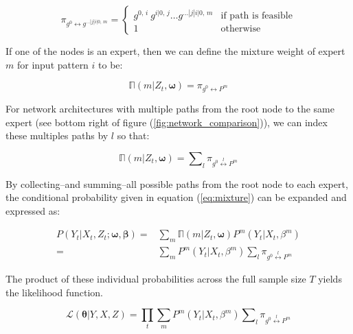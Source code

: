 \documentclass[12pt]{article}
\newcommand{\gateprod}[2]{\pi_{#1 \longleftrightarrow #2}}
\newcommand{\sumgateprod}[3]{\pi_{#1 \overset{#3}{\longleftrightarrow} #2}}
\newcommand{\shortsum}[1]{\sum \nolimits_{#1}}
\newcommand{\expmixwt}[0]{\mathbb{\Pi}}
\begin{document}
\begin{equation} \label{eq:gpath}
  \gateprod{g^{0}}{g^{\ldots|j|i|0, \, m}} =
    \begin{cases} 
       g^{0, \, i} \ g^{i|0, \, j} \ldots g^{\dots|j|i|0, \, m} & \textrm{if path is feasible} \\
       1 & \textrm{otherwise}
    \end{cases}
\end{equation}

If one of the nodes is an expert, then we can define the mixture weight
of expert $m$ for input pattern $i$ to be:

\begin{equation} \label{eq:pathsum}
  \expmixwt(m | Z_{t}, \boldsymbol{\omega}) = \gateprod{g^{0}}{P^{m}}
\end{equation}

For network architectures with multiple paths from the root node to
the same expert (see bottom right of figure (\ref{fig:network_comparison})),
we can index these multiples paths by $l$ so that:

\begin{equation} \label{eq:pathsums}
  \expmixwt(m | Z_{t}, \boldsymbol{\omega}) = \shortsum{l} \sumgateprod{g^{0}}{P^{m}}{l} 
\end{equation}


By collecting--and summing--all possible paths from the root node to each
expert, the conditional probability given in equation (\ref{eq:mixture}) can be
expanded and expressed as:

\begin{equation} \label{eq:contribution}
  \begin{split}
    P(Y_{t}|X_{t}, Z_{t}; \boldsymbol{\omega}, \boldsymbol{\beta}) =& \sum_{m} \expmixwt(m | Z_{t}, \boldsymbol{\omega}) P^{m}(Y_{t}|X_{t},\beta^{m}) \\ 
      =& \sum_{m} P^{m}(Y_{t}|X_{t}, \beta^{m}) \shortsum{l} \sumgateprod{g^{0}}{P^{m}}{l}
  \end{split}
\end{equation}

The product of these individual probabilities across the full sample size $T$ yields
the likelihood function.

\begin{equation} \label{eq:likelihood}
  \mathcal{L}(\boldsymbol{\theta}| Y, X, Z) = \prod_{t}\sum_{m}P^{m}(Y_{t}|X_{t}, \beta^{m}) \shortsum{l} \sumgateprod{g^{0}}{P^{m}}{l}
\end{equation}
\end{document}

